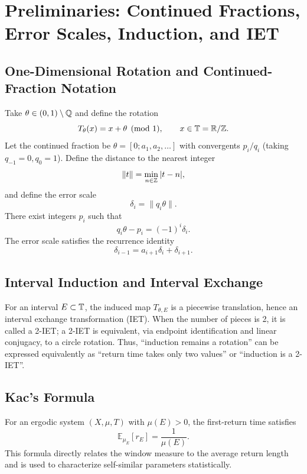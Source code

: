 \section{Preliminaries: Continued Fractions, Error Scales, Induction, and IET}

\subsection{One-Dimensional Rotation and Continued-Fraction Notation}

Take $\theta\in(0,1)\setminus\mathbb{Q}$ and define the rotation
\[
T_\theta(x)=x+\theta \pmod 1,\qquad x\in\mathbb{T}=\mathbb{R}/\mathbb{Z}.
\]
Let the continued fraction be $\theta=[0;a_1,a_2,\dots]$ with convergents $p_i/q_i$ (taking $q_{-1}=0,q_0=1$). Define the distance to the nearest integer
\[
\lVert t\rVert=\min_{n\in\mathbb{Z}}|t-n|,
\]
and define the error scale
\[
\delta_i=\lVert q_i\theta\rVert.
\]
There exist integers $p_i$ such that
\[
q_i\theta-p_i=(-1)^i\delta_i.
\]
The error scale satisfies the recurrence identity
\[
\delta_{i-1}=a_{i+1}\delta_i+\delta_{i+1}.
\]

\subsection{Interval Induction and Interval Exchange}

For an interval $E\subset\mathbb{T}$, the induced map $T_{\theta,E}$ is a piecewise translation, hence an interval exchange transformation (IET). When the number of pieces is 2, it is called a 2-IET; a 2-IET is equivalent, via endpoint identification and linear conjugacy, to a circle rotation. Thus, ``induction remains a rotation'' can be expressed equivalently as ``return time takes only two values'' or ``induction is a 2-IET''.

\subsection{Kac's Formula}

For an ergodic system $(X,\mu,T)$ with $\mu(E)>0$, the first-return time satisfies
\[
\mathbb{E}_{\mu_E}[r_E]=\frac{1}{\mu(E)}.
\]
This formula directly relates the window measure to the average return length and is used to characterize self-similar parameters statistically.
